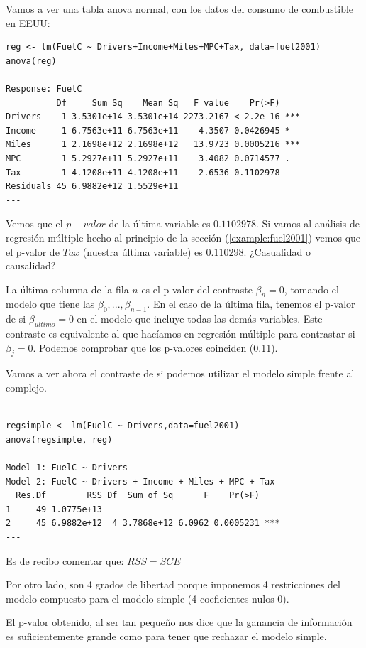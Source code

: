 \begin{example}
Vamos a ver una tabla anova normal, con los datos del consumo de combustible en EEUU:

\begin{lstlisting}[style=mystyle]
reg <- lm(FuelC ~ Drivers+Income+Miles+MPC+Tax, data=fuel2001)
anova(reg)

Response: FuelC
          Df     Sum Sq    Mean Sq   F value    Pr(>F)
Drivers    1 3.5301e+14 3.5301e+14 2273.2167 < 2.2e-16 ***
Income     1 6.7563e+11 6.7563e+11    4.3507 0.0426945 *
Miles      1 2.1698e+12 2.1698e+12   13.9723 0.0005216 ***
MPC        1 5.2927e+11 5.2927e+11    3.4082 0.0714577 .
Tax        1 4.1208e+11 4.1208e+11    2.6536 0.1102978
Residuals 45 6.9882e+12 1.5529e+11
---
\end{lstlisting}

Vemos que el $p-valor$ de la última variable es $0.1102978$. Si vamos al análisis de regresión múltiple hecho al principio de la sección (\ref{example:fuel2001}) vemos que el p-valor de $Tax$ (nuestra última variable) es $0.110298$. ¿Casualidad o causalidad?

La última columna de la fila $n$ es el p-valor del contraste $β_n = 0$, tomando el modelo que tiene las $β_0,...,β_{n-1}$. En el caso de la última fila, tenemos el p-valor de si $β_{ultimo} = 0$ en el modelo que incluye todas las demás variables. Este contraste es equivalente al que hacíamos en regresión múltiple para contrastar si $β_j = 0$. Podemos comprobar que los p-valores coinciden (0.11).

\end{example}



\begin{example}
Vamos a ver ahora el contraste de si podemos utilizar el modelo simple frente al complejo.

\begin{lstlisting}[style=mystyle]

regsimple <- lm(FuelC ~ Drivers,data=fuel2001)
anova(regsimple, reg)

Model 1: FuelC ~ Drivers
Model 2: FuelC ~ Drivers + Income + Miles + MPC + Tax
  Res.Df        RSS Df  Sum of Sq      F    Pr(>F)
1     49 1.0775e+13
2     45 6.9882e+12  4 3.7868e+12 6.0962 0.0005231 ***
---
\end{lstlisting}

Es de recibo comentar que: $RSS = SCE$

Por otro lado, son 4 grados de libertad porque imponemos 4 restricciones del modelo compuesto para el modelo simple (4 coeficientes nulos 0).


El p-valor obtenido, al ser tan pequeño nos dice que la ganancia de información es suficientemente grande como para tener que rechazar el modelo simple.

\end{example}

